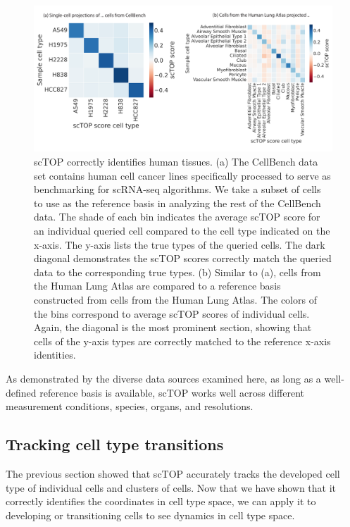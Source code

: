 \documentclass[aps,superscriptaddress, notitlepage,longbibliography]{revtex4-1}
\begin{document}
\begin{figure}
	\centering
		\includegraphics[scale=0.8]{figs/fig3.pdf}
	\caption{scTOP correctly identifies human tissues. (a) The CellBench data set contains human cell cancer lines specifically processed to serve as benchmarking for scRNA-seq algorithms. We take a subset of cells to use as the reference basis in analyzing the rest of the CellBench data. The shade of each bin indicates the average scTOP score for an individual queried cell compared to the cell type indicated on the x-axis. The y-axis lists the true types of the queried cells. The dark diagonal demonstrates the scTOP scores correctly match the queried data to the corresponding true types. (b) Similar to (a), cells from the Human Lung Atlas are compared to a reference basis constructed from cells from the Human Lung Atlas. The colors of the bins correspond to average scTOP scores of individual cells. Again, the diagonal is the most prominent section, showing that cells of the y-axis types are correctly matched to the reference x-axis identities.}
	\label{FIG:3}
\end{figure}

As demonstrated by the diverse data sources examined here, as long as a well-defined reference basis is available, scTOP works well across different measurement conditions, species, organs, and resolutions.

\subsection{Tracking cell type transitions}
The previous section showed that scTOP accurately tracks the developed cell type of individual cells and clusters of cells. Now that we have shown that it correctly identifies the coordinates in cell type space, we can apply it to developing or transitioning cells to see dynamics in cell type space.
\end{document}
